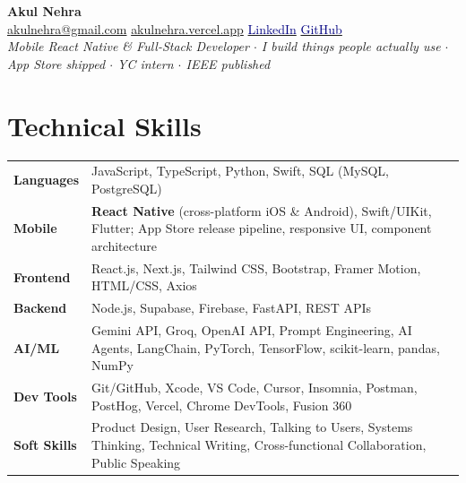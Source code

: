 \documentclass[10.4pt,letterpaper]{article}
\begin{document}
\begin{center}
  {\LARGE\bfseries\color{navy} Akul Nehra}\\[3pt]
  \small
  \href{mailto:akulnehra@gmail.com}{akulnehra@gmail.com}\enspace\textbar\enspace
  \href{https://akulnehra.vercel.app}{akulnehra.vercel.app}\enspace\textbar\enspace
  \href{https://www.linkedin.com/in/akul-nehra-629994330/}{\textcolor{navy}{LinkedIn}}\enspace\textbar\enspace
  \href{https://github.com/Akul-beep}{\textcolor{navy}{GitHub}}\\[3pt]
  \small\textit{Mobile React Native \& Full-Stack Developer $\cdot$ I build things people actually use $\cdot$ App Store shipped $\cdot$ YC intern $\cdot$ IEEE published}
\end{center}

\section{Technical Skills}
\small
\begin{tabular}{@{}p{2.1cm}p{15.1cm}}
\textbf{Languages}    & JavaScript, TypeScript, Python, Swift, SQL (MySQL, PostgreSQL) \\[1.5pt]
\textbf{Mobile}       & \textbf{React Native} (cross-platform iOS \& Android), Swift/UIKit, Flutter; App Store release pipeline, responsive UI, component architecture \\[1.5pt]
\textbf{Frontend}     & React.js, Next.js, Tailwind CSS, Bootstrap, Framer Motion, HTML/CSS, Axios \\[1.5pt]
\textbf{Backend}      & Node.js, Supabase, Firebase, FastAPI, REST APIs \\[1.5pt]
\textbf{AI/ML}        & Gemini API, Groq, OpenAI API, Prompt Engineering, AI Agents, LangChain, PyTorch, TensorFlow, scikit-learn, pandas, NumPy \\[1.5pt]
\textbf{Dev Tools}    & Git/GitHub, Xcode, VS Code, Cursor, Insomnia, Postman, PostHog, Vercel, Chrome DevTools, Fusion 360 \\[1.5pt]
\textbf{Soft Skills}  & Product Design, User Research, Talking to Users, Systems Thinking, Technical Writing, Cross-functional Collaboration, Public Speaking
\end{tabular}
\end{document}
